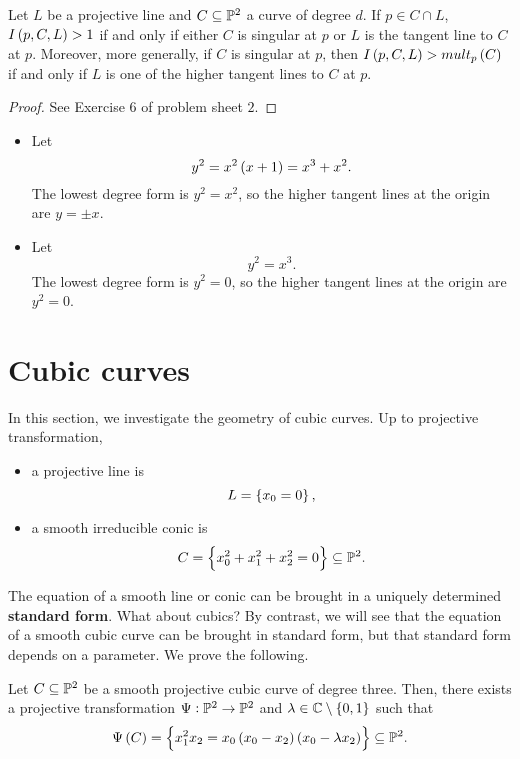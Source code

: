 \begin{proposition}
\label{prop:12.14}
Let $ L $ be a projective line and $ C \subseteq \P^2 $ a curve of degree $ d $. If $ p \in C \cap L $, $ I\br{p, C, L} > 1 $ if and only if either $ C $ is singular at $ p $ or $ L $ is the tangent line to $ C $ at $ p $. Moreover, more generally, if $ C $ is singular at $ p $, then $ I\br{p, C, L} > mult_p\br{C} $ if and only if $ L $ is one of the higher tangent lines to $ C $ at $ p $.
\end{proposition}

\begin{proof}
See Exercise $ 6 $ of problem sheet $ 2 $.
\end{proof}

\begin{example*}
\hfill
\begin{itemize}
\item Let
$$ y^2 = x^2\br{x + 1} = x^3 + x^2. $$
The lowest degree form is $ y^2 = x^2 $, so the higher tangent lines at the origin are $ y = \pm x $.
\item Let
$$ y^2 = x^3. $$
The lowest degree form is $ y^2 = 0 $, so the higher tangent lines at the origin are $ y^2 = 0 $.
\end{itemize}
\end{example*}

\pagebreak

\section{Cubic curves}

In this section, we investigate the geometry of cubic curves. Up to projective transformation,
\begin{itemize}
\item a projective line is
$$ L = \cbr{x_0 = 0}, $$
\item a smooth irreducible conic is
$$ C = \cbr{x_0^2 + x_1^2 + x_2^2 = 0} \subseteq \P^2. $$
\end{itemize}
The equation of a smooth line or conic can be brought in a uniquely determined \textbf{standard form}. What about cubics? By contrast, we will see that the equation of a smooth cubic curve can be brought in standard form, but that standard form depends on a parameter. We prove the following.

\begin{theorem}
\label{thm:13.1}
Let $ C \subseteq \P^2 $ be a smooth projective cubic curve of degree three. Then, there exists a projective transformation $ \Psi : \P^2 \to \P^2 $ and $ \lambda \in \C \setminus \cbr{0, 1} $ such that
$$ \Psi\br{C} = \cbr{x_1^2x_2 = x_0\br{x_0 - x_2}\br{x_0 - \lambda x_2}} \subseteq \P^2. $$
\end{theorem}

